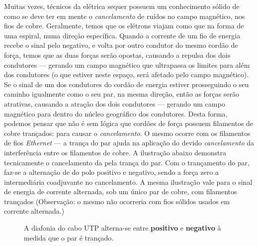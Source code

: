 \documentclass[	DIV=calc,%
							paper=a4,%
							fontsize=12pt,%
							onecolumn]{scrartcl}	 					%
\begin{document}
Muitas vezes, técnicos da elétrica sequer possuem um conhecimento sólido de como se deve ter em mente o \textit{cancelamento} de ruídos no campo magnético, nos fios de cobre. Geralmente, temos que os elétrons viajam como que na forma de uma espiral, numa direção específica. Quando a corrente de um fio de energia recebe o sinal pelo negativo, e volta por outro condutor do mesmo cordão de força, temos que as duas forças serão opostas, causando a repulsa dos dois condutores --- gerando um campo magnético que ultrapassa os limites para além dos condutores (o que estiver neste espaço, será afetado pelo campo magnético). Se o sinal de um dos condutores do cordão de energia estiver prosseguindo o seu caminho igualmente como o seu par, na mesma direção, então as forças serão atrativas, causando a atração dos dois condutores --- gerando um campo magnético para dentro do núcleo geográfico dos condutores. Desta forma, podemos pensar que não é sem lógica que cordões de força possuem filamentos de cobre trançados: para causar o \textit{cancelamento}. O mesmo ocorre com os filamentos de fios \textit{Ethernet} --- a trança do par ajuda na aplicação do devido \textit{cancelamento} da interferência entre os filamentos de cobre. A ilustração abaixo demonstra tecnicamente o cancelamento da pela trança do par. Com o trançamento do par, faz-se a alternação de do polo positivo e negativo, sendo a força zero a intermediária coadjuvante no cancelamento. A mesma ilustração vale para o sinal de energia de corrente alternada, sob um único par de cobre, com filamentos trançados (Observação: o mesmo não ocorreria com fios sólidos usados em corrente alternada.)
\\

\begin{figure}[H]
	\noindent{}
	\caption{A diafonia do cabo UTP alterna-se entre \textbf{positivo} e \textbf{negativo} à medida que o par é trançado. \cite{cancel}}
	\label{fig6}
\end{figure}
\end{document}
